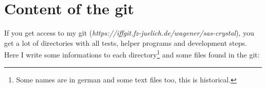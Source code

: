 \documentclass[11pt]{article} %
\begin{document}
\clearpage
\appendix



\section{Content of the git}

If you get access to my git ({\it https://iffgit.fz-juelich.de/wagener/sas-crystal}), you get a lot of directories with all tests, helper programs and development steps. Here I write some informations to each directory\footnote{Some names are in german and some text files too, this is historical.} and some files found in the git:
\end{document}
